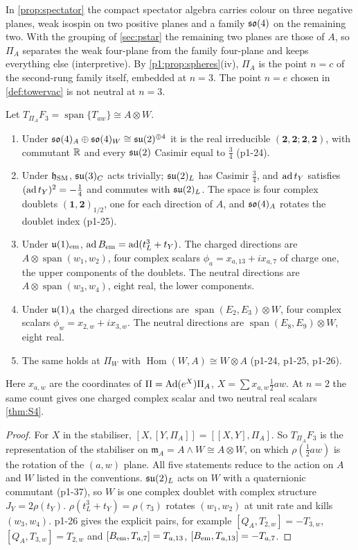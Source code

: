 In \cref{prop:spectator} the compact spectator algebra carries colour on three negative planes, weak isospin on two positive planes and a family $\mathfrak{so}(4)$ on the remaining
two. With the grouping of \cref{sec:pstar} the remaining two planes are those of $A$, so $\Pi_A$ separates the weak four-plane from the family four-plane and keeps
everything else (interpretive). By \cref{p1:prop:spheres}(iv), $\Pi_A$ is the point $n=c$ of the second-rung family itself, embedded at $n=3$. The point $n=e$ chosen in
\cref{def:towervac} is not neutral at $n=3$.

\begin{theorem}
\label{p1:thm:tangent}
Let $T_{\Pi_A}F_3=\operatorname{span}\{T_{aw}\}\cong A\otimes W$.
\begin{enumerate}[label=(\roman*),leftmargin=2.2em]
\item Under $\mathfrak{so}(4)_A\oplus\mathfrak{so}(4)_W\cong\mathfrak{su}(2)^{\oplus4}$ it is the real irreducible $(\mathbf2,\mathbf2;\mathbf2,\mathbf2)$, with commutant $\mathbb{R}$ and every $\mathfrak{su}(2)$ Casimir equal to
$\tfrac34$ (p1-24).
\item Under $\mathfrak h_{\rm SM}$, $\mathfrak{su}(3)_C$ acts trivially; $\mathfrak{su}(2)_L$ has Casimir $\tfrac34$, and $\operatorname{ad} t_Y$ satisfies $(\operatorname{ad} t_Y)^2=-\tfrac14$ and commutes with $\mathfrak{su}(2)_L$. The space is four
complex doublets $(\mathbf1,\mathbf2)_{1/2}$, one for each direction of $A$, and $\mathfrak{so}(4)_A$ rotates the doublet index (p1-25).
\item Under $\mathfrak{u}(1)_{\rm em}$, $\operatorname{ad} B_{\rm em}=\operatorname{ad}(t^3_L+t_Y)$. The charged directions are $A\otimes\operatorname{span}(w_1,w_2)$, four complex scalars
$\phi_a=x_{a,13}+ix_{a,7}$ of charge one, the upper components of the doublets. The neutral directions are $A\otimes\operatorname{span}(w_3,w_4)$, eight real, the lower
components.
\item Under $\mathfrak{u}(1)_A$ the charged directions are $\operatorname{span}(E_2,E_3)\otimes W$, four complex scalars $\phi_w=x_{2,w}+ix_{3,w}$. The neutral directions are
$\operatorname{span}(E_8,E_9)\otimes W$, eight real.
\item The same holds at $\Pi_W$ with $\operatorname{Hom}(W,A)\cong W\otimes A$ (p1-24, p1-25, p1-26).
\end{enumerate}
Here $x_{a,w}$ are the coordinates of $\Pi=\operatorname{Ad}(e^X)\Pi_A$, $X=\sum x_{a,w}\tfrac12aw$. At $n=2$ the same count gives one charged complex scalar and two neutral real
scalars \cref{thm:S4}.
\end{theorem}

\begin{proof}
For $X$ in the stabiliser, $[X,[Y,\Pi_A]]=[[X,Y],\Pi_A]$. So $T_{\Pi_A}F_3$ is the representation of the stabiliser on $\mathfrak m_A=A\wedge W\cong A\otimes W$, on which
$\rho(\tfrac12aw)$ is the rotation of the $(a,w)$ plane. All five statements reduce to the action on $A$ and $W$ listed in the conventions. $\mathfrak{su}(2)_L$ acts on $W$ with a
quaternionic commutant (p1-37), so $W$ is one complex doublet with complex structure $J_Y=2\rho(t_Y)$. $\rho(t^3_L+t_Y)=\rho(\tau_3)$ rotates $(w_1,w_2)$ at unit rate and
kills $(w_3,w_4)$. p1-26 gives the explicit pairs, for example $[Q_A,T_{2,w}]=-T_{3,w}$, $[Q_A,T_{3,w}]=T_{2,w}$ and $[B_{\rm em},T_{a,7}]=T_{a,13}$, $[B_{\rm em},T_{a,13}]=-T_{a,7}$.
\end{proof}

